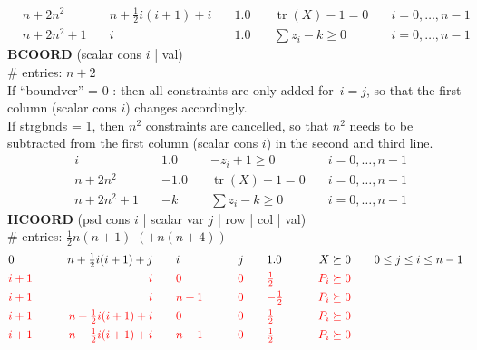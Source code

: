 \documentclass[11pt,a4paper]{article}
\DeclareMathOperator{\tr}{tr}
\theoremstyle{definition}
\begin{document}
{\[\begin{aligned}
    & n+2n^2 \quad & n+\tfrac{1}{2}i(i+1)+i \quad & 1.0 \quad & \tr(X) -
    1 = 0 \quad & i = 0,\dots,n-1 \\
    & n+2n^2+1 \quad & i \quad & 1.0 \quad & \sum z_i - k \geq 0 \quad &
    i = 0,\dots,n-1
  \end{aligned}
\]
\textbf{BCOORD} (scalar cons $i$ | val) \\
\# entries: $n+2$ \\
{\color{violet} If ``boundver'' = 0 : then all constraints are only added
  for~$i=j$, so that the first column (scalar cons $i$) changes accordingly.} \\
{\color{blue} If strgbnds = 1, then $n^2$ constraints are cancelled, so
  that $n^2$ needs to be subtracted from the first column
  (scalar cons $i$) in the second and third line.}
\[
  \begin{aligned}
    & i \quad & 1.0 \quad & -z_i + 1 \geq 0 \quad & i = 0,\dots,n-1 \\
    & n+2n^2 \quad & -1.0 \quad & \tr(X) - 1 = 0 \quad & i = 0,\dots,n-1
    \\
    & n+2n^2+1 \quad & -k  \quad & \sum z_i - k \geq 0 \quad & i =
    0,\dots,n-1
  \end{aligned}
\]
\textbf{HCOORD} (psd cons $i$ | scalar var $j$ | row | col | val) \\
\# entries: $\tfrac{1}{2}n(n+1)$ {\color{red} $(+n(n+4))$} \\
\[
  \begin{aligned}
    &0 \qquad &n+\tfrac{1}{2}i(i+1)+j \qquad &i \qquad &j \qquad &1.0
    \qquad &X \succeq 0 \qquad &0 \leq j \leq i \leq n-1 \\
    &{\color{red}i+1} \qquad &{\color{red}i} \qquad &{\color{red}0} \qquad
    &{\color{red}0} \qquad &{\color{red}\tfrac{1}{2}} \qquad
    &{\color{red}P_i \succeq 0} \qquad & \\
    &{\color{red}i+1} \qquad &{\color{red}i} \qquad &{\color{red}n+1} \qquad
    &{\color{red}0} \qquad &{\color{red}-\tfrac{1}{2}} \qquad
    &{\color{red}P_i \succeq 0} \qquad &\\
    &{\color{red}i+1} \qquad &{\color{red}n+\tfrac{1}{2}i(i+1)+i} \qquad &{\color{red}0} \qquad
    &{\color{red}0} \qquad &{\color{red}\tfrac{1}{2}} \qquad
    &{\color{red}P_i \succeq 0} \qquad &\\
    &{\color{red}i+1} \qquad &{\color{red}n+\tfrac{1}{2}i(i+1)+i} \qquad &{\color{red}n+1} \qquad
    &{\color{red}0} \qquad &{\color{red}\tfrac{1}{2}} \qquad
    &{\color{red}P_i \succeq 0} \qquad &\\

\end{aligned}\]}
\end{document}

